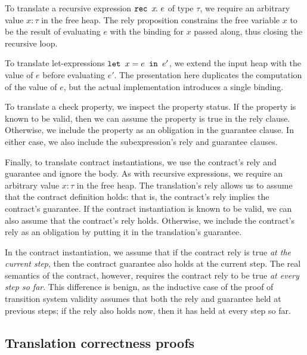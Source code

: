 To translate a recursive expression $\texttt{rec~} x\hspace{-0.1em}.~e$ of type $\tau$, we require an arbitrary value $x: \tau$ in the free heap.
The rely proposition constrains the free variable $x$ to be the result of evaluating $e$ with the binding for $x$ passed along, thus closing the recursive loop.

To translate let-expressions $\texttt{let~} x = e \texttt{~in~} e'$, we extend the input heap with the value of $e$ before evaluating $e'$.
The presentation here duplicates the computation of the value of $e$, but the actual implementation introduces a single binding.

To translate a check property, we inspect the property status.
If the property is known to be valid, then we can assume the property is true in the rely clause.
Otherwise, we include the property as an obligation in the guarantee clause.
In either case, we also include the subexpression's rely and guarantee clauses.

Finally, to translate contract instantiations, we use the contract's rely and guarantee and ignore the body.
As with recursive expressions, we require an arbitrary value $x: \tau$ in the free heap.
The translation's rely allows us to assume that the contract definition holds: that is, the contract's rely implies the contract's guarantee.
If the contract instantiation is known to be valid, we can also assume that the contract's rely holds.
Otherwise, we include the contract's rely as an obligation by putting it in the translation's guarantee.

In the contract instantiation, we assume that if the contract rely is true \emph{at the current step}, then the contract guarantee also holds at the current step.
The real semantics of the contract, however, requires the contract rely to be true \emph{at every step so far}.
This difference is benign, as the inductive case of the proof of transition system validity assumes that both the rely and guarantee held at previous steps; if the rely also holds now, then it has held at every step so far.

\subsection{Translation correctness proofs}
\label{s:transition:proof}

